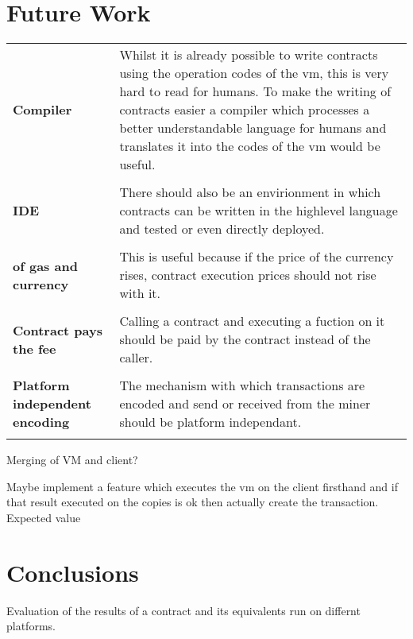 \section{Future Work}

\begin{tabular}[t]{ p{3cm} p{12.5cm}}
\raggedright
\textbf{Compiler} & 
Whilst it is already possible to write contracts using the operation codes of the vm, this is very hard to read for humans. To make the writing of contracts easier a compiler which processes a better understandable language for humans and translates it into the codes of the vm would be useful. \\ \\

\textbf{IDE} & 
There should also be an envirionment in which contracts can be written in the highlevel language and tested or even directly deployed. \\ \\

\raggedright
\textbf{of gas and currency} & 
This is useful because if the price of the currency rises, contract execution prices should not rise with it. \\ \\

\raggedright
\textbf{Contract pays the fee} & 
Calling a contract and executing a fuction on it should be paid by the contract instead of the caller. \\ \\

\raggedright
\textbf{Platform independent encoding} &
The mechanism with which transactions are encoded and send or received from the miner should be platform independant.\\ \\ 
\end{tabular}

Merging of VM and client?


Maybe implement a feature which executes the vm on the client firsthand and if that result executed on the copies is ok then actually create the transaction. Expected value


\section{Conclusions}
Evaluation of the results of a contract and its equivalents run on differnt platforms.